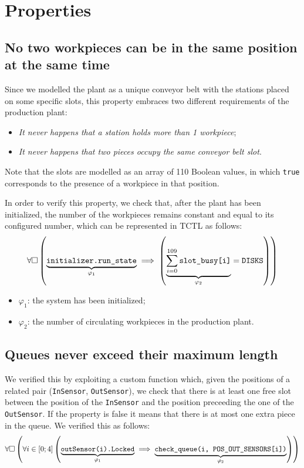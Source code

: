 \documentclass[a4paper]{article}
\newcommand{\formulacomment}[2]{\underset{\varphi_{#1}}{\underbrace{#2}}}
\newcommand{\formulatext}[1]{\text{\texttt{#1}}}
\begin{document}
    \section{Properties}

    \subsection{No two workpieces can be in the same position at the same time} \label{property:1-2}

    Since we modelled the plant as a unique conveyor belt with the stations placed on some specific slots, this property embraces two different requirements of the production plant:
    \begin{itemize}
        \item \textit{It never happens that a station holds more than 1 workpiece};
        \item \textit{It never happens that two pieces occupy the same conveyor belt slot}.
    \end{itemize}

    Note that the slots are modelled as an array of 110 Boolean values, in which \texttt{true} corresponds to the presence of a workpiece in that position.\medskip

    In order to verify this property, we check that, after the plant has been initialized, the number of the workpieces remains constant and equal to its configured number, which can be represented in TCTL as follows:
    \[\forall \square \left(\formulacomment{1}{\formulatext{initializer.run\_state}} \implies \left(\formulacomment{2}{\sum_{i = 0}^{109} \formulatext{slot\_busy[i]}} = \formulatext{DISKS}\right)\right)\]

    \begin{itemize}
        \item \(\varphi_1\): the system has been initialized;
        \item \(\varphi_2\): the number of circulating workpieces in the production plant.
    \end{itemize}

    \subsection{Queues never exceed their maximum length} \label{property:3}

    We verified this by exploiting a custom function which, given the positions of a related pair (\texttt{InSensor}, \texttt{OutSensor}), we check that there is at least one free slot between the position of the \texttt{InSensor} and the position preceeding the one of the \texttt{OutSensor}. If the property is false it means that there is at most one extra piece in the queue. We verified this as follows:
    \[\forall \square \left(\forall i \in \left[0; 4\right] \left(\formulacomment{1}{\formulatext{outSensor(i).Locked}} \implies \formulacomment{2}{\formulatext{check\_queue(i, POS\_OUT\_SENSORS[i])}}\right)\right)\]
\end{document}
